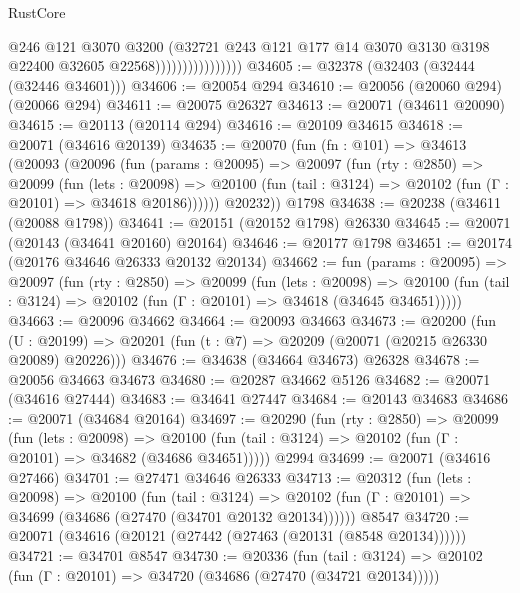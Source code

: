 \begin{lexlean}{RustCore}
\begin{coremodule}
                                  @246
                                  @121
                                  @3070
                                  @3200
                                  (@32721
                                    @243
                                    @121
                                    @177
                                    @14
                                    @3070
                                    @3130
                                    @3198
                                    @22400
                                    @32605
                                    @22568))))))))))))))))
@34605 := @32378 (@32403 (@32444 (@32446 @34601)))
@34606 := @20054 @294
@34610 := @20056 (@20060 @294) (@20066 @294)
@34611 := @20075 @26327
@34613 := @20071 (@34611 @20090)
@34615 := @20113 (@20114 @294)
@34616 := @20109 @34615
@34618 := @20071 (@34616 @20139)
@34635 := @20070
    (fun (fn : @101) =>
    @34613
      (@20093
        (@20096
          (fun (params : @20095) =>
          @20097
            (fun (rty : @2850) =>
            @20099
              (fun (lets : @20098) =>
              @20100 (fun (tail : @3124) => @20102 (fun (Γ : @20101) => @34618 @20186))))))
        @20232))
    @1798
@34638 := @20238 (@34611 (@20088 @1798))
@34641 := @20151 (@20152 @1798) @26330
@34645 := @20071 (@20143 (@34641 @20160) @20164)
@34646 := @20177 @1798
@34651 := @20174 (@20176 @34646 @26333 @20132 @20134)
@34662 := fun (params : @20095) =>
  @20097
    (fun (rty : @2850) =>
    @20099
      (fun (lets : @20098) =>
      @20100 (fun (tail : @3124) => @20102 (fun (Γ : @20101) => @34618 (@34645 @34651)))))
@34663 := @20096 @34662
@34664 := @20093 @34663
@34673 := @20200
    (fun (U : @20199) => @20201 (fun (t : @7) => @20209 (@20071 (@20215 @26330 @20089) @20226)))
@34676 := @34638 (@34664 @34673) @26328
@34678 := @20056 @34663 @34673
@34680 := @20287 @34662 @5126
@34682 := @20071 (@34616 @27444)
@34683 := @34641 @27447
@34684 := @20143 @34683
@34686 := @20071 (@34684 @20164)
@34697 := @20290
    (fun (rty : @2850) =>
    @20099
      (fun (lets : @20098) =>
      @20100 (fun (tail : @3124) => @20102 (fun (Γ : @20101) => @34682 (@34686 @34651)))))
    @2994
@34699 := @20071 (@34616 @27466)
@34701 := @27471 @34646 @26333
@34713 := @20312
    (fun (lets : @20098) =>
    @20100
      (fun (tail : @3124) =>
      @20102 (fun (Γ : @20101) => @34699 (@34686 (@27470 (@34701 @20132 @20134))))))
    @8547
@34720 := @20071 (@34616 (@20121 (@27442 (@27463 (@20131 (@8548 @20134))))))
@34721 := @34701 @8547
@34730 := @20336
    (fun (tail : @3124) => @20102 (fun (Γ : @20101) => @34720 (@34686 (@27470 (@34721 @20134)))))

\end{coremodule}
\end{lexlean}
